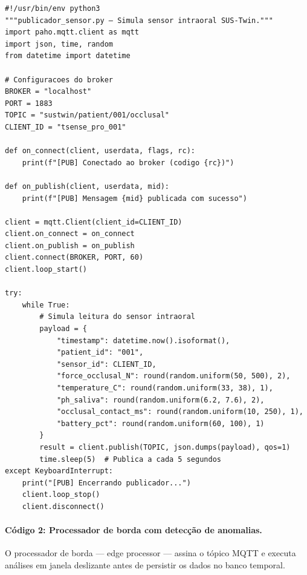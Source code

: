 \begin{lstlisting}[style=pythonstyle, caption=Publicador MQTT que simula sensor intraoral T-Sense Pro, label=cod:publisher]
#!/usr/bin/env python3
"""publicador_sensor.py — Simula sensor intraoral SUS-Twin."""
import paho.mqtt.client as mqtt
import json, time, random
from datetime import datetime

# Configuracoes do broker
BROKER = "localhost"
PORT = 1883
TOPIC = "sustwin/patient/001/occlusal"
CLIENT_ID = "tsense_pro_001"

def on_connect(client, userdata, flags, rc):
    print(f"[PUB] Conectado ao broker (codigo {rc})")

def on_publish(client, userdata, mid):
    print(f"[PUB] Mensagem {mid} publicada com sucesso")

client = mqtt.Client(client_id=CLIENT_ID)
client.on_connect = on_connect
client.on_publish = on_publish
client.connect(BROKER, PORT, 60)
client.loop_start()

try:
    while True:
        # Simula leitura do sensor intraoral
        payload = {
            "timestamp": datetime.now().isoformat(),
            "patient_id": "001",
            "sensor_id": CLIENT_ID,
            "force_occlusal_N": round(random.uniform(50, 500), 2),
            "temperature_C": round(random.uniform(33, 38), 1),
            "ph_saliva": round(random.uniform(6.2, 7.6), 2),
            "occlusal_contact_ms": round(random.uniform(10, 250), 1),
            "battery_pct": round(random.uniform(60, 100), 1)
        }
        result = client.publish(TOPIC, json.dumps(payload), qos=1)
        time.sleep(5)  # Publica a cada 5 segundos
except KeyboardInterrupt:
    print("[PUB] Encerrando publicador...")
    client.loop_stop()
    client.disconnect()
\end{lstlisting}

\paragraph{Código 2: Processador de borda com detecção de anomalias.}

O processador de borda --- edge processor --- assina o tópico MQTT e executa análises em janela deslizante antes de persistir os dados no banco temporal.

